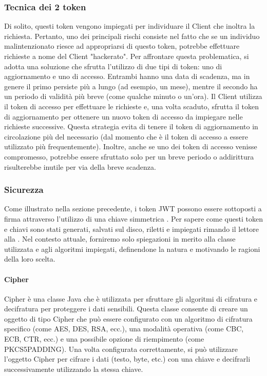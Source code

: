 \subsubsection{Tecnica dei 2 token} \label{subsub:twotoken}
Di solito, questi token vengono impiegati per individuare il Client che inoltra la richiesta. Pertanto, uno dei principali rischi consiste nel fatto che se un individuo malintenzionato riesce ad appropriarsi di questo token, potrebbe effettuare richieste a nome del Client "hackerato". Per affrontare questa problematica, si adotta una soluzione che sfrutta l'utilizzo di due tipi di token: uno di aggiornamento e uno di accesso. Entrambi hanno una data di scadenza, ma in genere il primo persiste più a lungo (ad esempio, un mese), mentre il secondo ha un periodo di validità più breve (come qualche minuto o un'ora). Il Client utilizza il token di accesso per effettuare le richieste e, una volta scaduto, sfrutta il token di aggiornamento per ottenere un nuovo token di accesso da impiegare nelle richieste successive. Questa strategia evita di tenere il token di aggiornamento in circolazione più del necessario (dal momento che è il token di accesso a essere utilizzato più frequentemente). Inoltre, anche se uno dei token di accesso venisse compromesso, potrebbe essere sfruttato solo per un breve periodo o addirittura risulterebbe inutile per via della breve scadenza.

\subsubsection{Sicurezza}\label{subsub:secure}
Come illustrato nella sezione precedente, i token JWT possono essere sottoposti a firma attraverso l'utilizzo di una chiave simmetrica \cite{chiave_simmetrica}. Per sapere come questi token e chiavi sono stati generati, salvati sul disco, riletti e impiegati rimando il lettore alla . Nel contesto attuale, forniremo solo spiegazioni in merito alla classe utilizzata e agli algoritmi impiegati, definendone la natura e motivando le ragioni della loro scelta.

\paragraph{Cipher}
Cipher \cite{cipher} è una classe Java che è utilizzata per sfruttare gli algoritmi di cifratura e decifratura per proteggere i dati sensibili.
Questa classe consente di creare un oggetto di tipo Cipher che può essere configurato con un algoritmo di cifratura specifico (come AES, DES, RSA, ecc.), una modalità operativa (come CBC, ECB, CTR, ecc.) e una possibile opzione di riempimento (come PKCS5PADDING). Una volta configurata correttamente, si può utilizzare l'oggetto Cipher per cifrare i dati (testo, byte, etc.) con una chiave e decifrarli successivamente utilizzando la stessa chiave.

